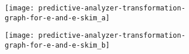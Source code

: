 \documentclass[border=3pt]{standalone}
\begin{document}
\begin{figure}
  \centering
  \begin{subfigure}[b]{0.45\linewidth}
    \centering
    \texttt{[image: predictive-analyzer-transformation-graph-for-e-and-e-skim\_a]}
    \caption{}
  \end{subfigure}
  \begin{subfigure}[b]{0.45\linewidth}
    \centering
    \texttt{[image: predictive-analyzer-transformation-graph-for-e-and-e-skim\_b]}
    \caption{}
  \end{subfigure}
\end{figure}
\end{document}
